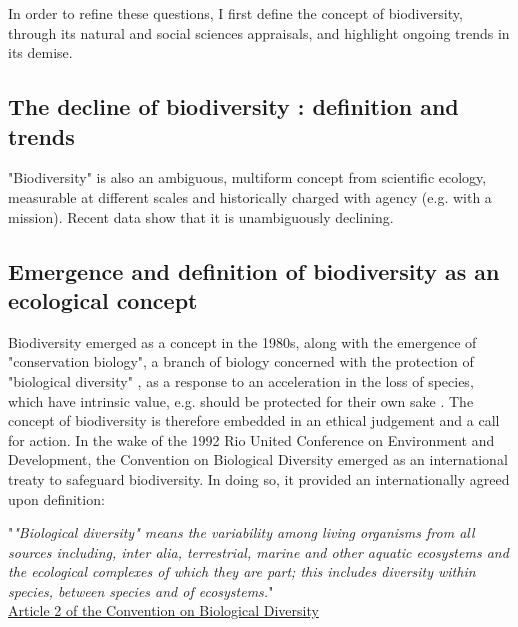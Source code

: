 In order to refine these questions, I first define the concept of biodiversity, through its natural and social sciences appraisals, and highlight ongoing trends in its demise.


\subsection*{The decline of biodiversity : definition and trends}

"Biodiversity" is also an ambiguous, multiform concept from scientific ecology, measurable at different scales and historically charged with agency (e.g. with a mission). Recent data show that it is unambiguously declining. 

\subsection*{Emergence and definition of biodiversity as an ecological concept}

Biodiversity emerged as a concept in the 1980s, along with the emergence of "conservation biology", a branch of biology concerned with the protection of "biological diversity" \citep{soule_what_1985}, as a response to an acceleration in the loss of species, which have intrinsic value, e.g. should be protected for their own sake \citep{soule_conservation_1986}. 
The concept of biodiversity is therefore embedded in an ethical judgement and a call for action. In the wake of the 1992 Rio United Conference on Environment and Development, the Convention on Biological Diversity emerged as an international treaty to safeguard biodiversity. In doing so, it provided an internationally agreed upon definition:

\begin{displayquote}
"\textit{"Biological diversity" means the variability among living organisms from all sources including, inter alia, terrestrial, marine and other aquatic ecosystems and the ecological complexes of which they are part; this includes diversity within species, between species and of ecosystems.}"\\
\hspace*{\fill} \small{\href{https://www.cbd.int/convention/articles/default.shtml?a=cbd-02}{Article 2 of the Convention on Biological Diversity}}
\end{displayquote}

